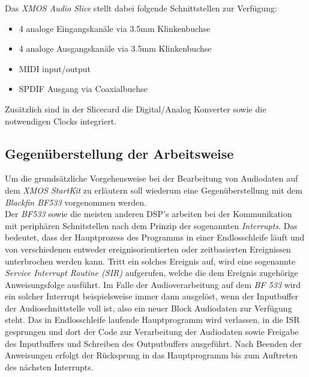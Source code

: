 \documentclass[paper=a4, fontsize=12pt]{scrartcl}
\numberwithin{equation}{section}		%
\numberwithin{figure}{section}			%
\numberwithin{table}{section}				%
\begin{document}
 
Das \textit{XMOS Audio Slice} stellt dabei folgende Schnittstellen zur Verfügung:

\begin{itemize}
	\item 4 analoge Eingangskanäle via 3.5mm Klinkenbuchse
	\item 4 analoge Ausgangskanäle via 3.5mm Klinkenbuchse
	\item MIDI input/output
	\item SPDIF Ausgang via Coaxialbuchse
\end{itemize}

Zusätzlich sind in der Slicecard die Digital/Analog Konverter sowie die notwendigen Clocks integriert.

\subsection{Gegenüberstellung der Arbeitsweise}
Um die grundsätzliche Vorgehensweise bei der Bearbeitung von Audiodaten auf dem \textit{XMOS StartKit} zu erläutern soll wiederum eine Gegenüberstellung mit dem \textit{Blackfin BF533} vorgenommen werden.\\
Der \textit{BF533} sowie die meisten anderen DSP's arbeiten bei der Kommunikation mit periphären Schnitstellen nach dem Prinzip der sogenannten \textit{Interrupts}. Das bedeutet, dass der Hauptprozess des Programms in einer Endlosschleife läuft und von verschiedenen entweder ereignisorientierten oder zeitbasierten Ereignissen unterbrochen werden kann. Tritt ein solches Ereignis auf, wird eine sogenannte \textit{Service Interrupt Routine (SIR)} aufgerufen, welche die dem Ereignis zugehörige Anweisungsfolge ausführt. Im Falle der Audioverarbeitung auf dem \textit{BF 533} wird ein solcher Interrupt beispielsweise immer dann ausgelöst, wenn der Inputbuffer der Audioschnittstelle voll ist, also ein neuer Block Audiodaten zur Verfügung steht. Das in Endlosschleife laufende Hauptprogramm wird verlassen, in die ISR gesprungen und dort der Code zur Verarbeitung der Audiodaten sowie Freigabe des Inputbuffers und Schreiben des Outputbuffers ausgeführt. Nach Beenden der Anweisungen erfolgt der Rücksprung in das Hauptprogramm bis zum Auftreten des nächsten Interrupts.\\
\end{document}
